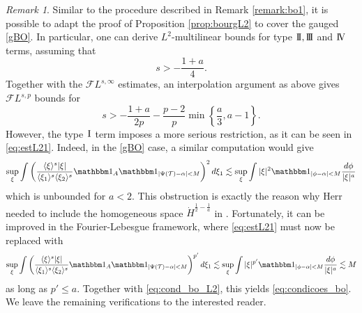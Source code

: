 \documentclass[%
11pt,  reqno]{amsart}
\newcommand{\I}{\hspace{0.2mm}\textup{I}\hspace{0.2mm}}
\newcommand{\II}{\textup{I \hspace{-2.9mm} I} }
\newcommand{\III}{\textup{I \hspace{-2.9mm} I \hspace{-2.9mm} I}}
\newcommand{\IV}{\textup{I \hspace{-2.9mm} V}}
\newcommand{\5}{\textup{V}}
\newcommand{\FL}{\mathcal{F} L}
\newcommand{\ind}{\mathbbm 1}
\newcommand{\les}{\lesssim}
\theoremstyle{remark}
\newtheorem{remark}[theorem]{Remark}
\newcommand{\TT}{\mathcal{T}}
\newcommand{\al}{\alpha}
\renewcommand{\l}{\ell}
\newcommand{\jb}[1]
{\langle #1 \rangle}
\numberwithin{equation}{section}
\numberwithin{theorem}{section}
\newcommand{\Ncal}{\mathcal{N}}
\begin{document}
\begin{remark}
    \label{remark:bo2} Similar to the procedure described in Remark \ref{remark:bo1}, it is possible to adapt the proof of Proposition \ref{prop:bourgL2} to cover the gauged \eqref{gBO}. In particular, one can derive $L^2$-multilinear bounds for type $\II, \III$ and $\IV$ terms, assuming that
    $$
    s>-\frac{1+a}{4}.
    $$
    Together with the $\FL^{s,\infty}$ estimates, an interpolation argument as above gives $\FL^{s,p}$ bounds for 
\begin{equation}\label{eq:cond_bo_L2}
        s>-\frac{1+a}{2p} - \frac{p-2}{p}\min\left\{\frac{a}3, a-1\right\}.
\end{equation}
However, the type $\I$ term imposes a more serious restriction, as it can be seen in \eqref{eq:estL21}. Indeed, in the \eqref{gBO} case, a similar computation would give
\begin{align}
    \sup_\xi \int \left(\frac{\jb{\xi}^{s} |\xi| }{\jb{\xi_1}^{s}\jb{\xi_2}^{s}} 
    \ind_A \ind_{|\Psi(\TT) - \al| < M } \right)^{2} d\xi_1
    \les \sup_\xi \int |\xi|^2 \ind_{|\phi - \al| < M } \frac{d\phi}{|\xi|^a } 
\end{align}
    which is unbounded for $a<2$. This obstruction is exactly the reason why Herr needed to include the homogeneous space $\dot H^{\frac12 - \frac1a}$ in \cite{herr_bo}. Fortunately, it can be improved in the Fourier-Lebesgue framework, where \eqref{eq:estL21} must now be replaced with
    \begin{align}
    \sup_\xi \int \left(\frac{\jb{\xi}^{s} |\xi| }{\jb{\xi_1}^{s}\jb{\xi_2}^{s}} 
    \ind_A \ind_{|\Psi(\TT) - \al| < M } \right)^{p'} d\xi_1
    \les \sup_\xi \int |\xi|^{p'} \ind_{|\phi - \al| < M } \frac{d\phi}{|\xi|^a } \lesssim M
\end{align}
as long as $p'\le a$. Together with \eqref{eq:cond_bo_L2}, this yields \eqref{eq:condicoes_bo}. We leave the remaining verifications to the interested reader.
\end{remark}



\end{document}

